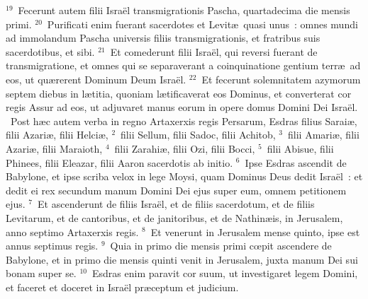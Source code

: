 ${}^{19}$~Fecerunt autem filii Isra\"el transmigrationis Pascha, quartadecima die mensis primi.
${}^{20}$~Purificati enim fuerant sacerdotes et Levit\ae\ quasi unus~: omnes mundi ad immolandum Pascha universis filiis transmigrationis, et fratribus suis sacerdotibus, et sibi.
${}^{21}$~Et comederunt filii Isra\"el, qui reversi fuerant de transmigratione, et omnes qui se separaverant a coinquinatione gentium terr\ae\ ad eos, ut qu\ae rerent Dominum Deum Isra\"el.
${}^{22}$~Et fecerunt solemnitatem azymorum septem diebus in l\ae titia, quoniam l\ae tificaverat eos Dominus, et converterat cor regis Assur ad eos, ut adjuvaret manus eorum in opere domus Domini Dei Isra\"el.
~Post h\ae c autem verba in regno Artaxerxis regis Persarum, Esdras filius Sarai\ae , filii Azari\ae , filii Helci\ae ,
${}^{2}$~filii Sellum, filii Sadoc, filii Achitob,
${}^{3}$~filii Amari\ae , filii Azari\ae , filii Maraioth,
${}^{4}$~filii Zarahi\ae , filii Ozi, filii Bocci,
${}^{5}$~filii Abisue, filii Phinees, filii Eleazar, filii Aaron sacerdotis ab initio.
${}^{6}$~Ipse Esdras ascendit de Babylone, et ipse scriba velox in lege Moysi, quam Dominus Deus dedit Isra\"el~: et dedit ei rex secundum manum Domini Dei ejus super eum, omnem petitionem ejus.
${}^{7}$~Et ascenderunt de filiis Isra\"el, et de filiis sacerdotum, et de filiis Levitarum, et de cantoribus, et de janitoribus, et de Nathin\ae is, in Jerusalem, anno septimo Artaxerxis regis.
${}^{8}$~Et venerunt in Jerusalem mense quinto, ipse est annus septimus regis.
${}^{9}$~Quia in primo die mensis primi cœpit ascendere de Babylone, et in primo die mensis quinti venit in Jerusalem, juxta manum Dei sui bonam super se.
${}^{10}$~Esdras enim paravit cor suum, ut investigaret legem Domini, et faceret et doceret in Isra\"el pr\ae ceptum et judicium.


